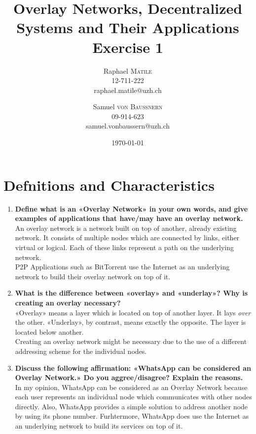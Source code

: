 \documentclass{article}
\title{Overlay Networks, Decentralized Systems and Their Applications\\Exercise 1} %
\author{Raphael \textsc{Matile}\\12-711-222\\raphael.matile@uzh.ch \and Samuel \textsc{von Baussnern}\\09-914-623\\samuel.vonbaussern@uzh.ch}
\date{\today} %
\begin{document}
\maketitle %

\section{Defnitions and Characteristics}
  \begin{enumerate}[1]
    \item \textbf{Define what is an «Overlay Network» in your own words, and give examples of applications that have/may have an overlay network.} \\
            An overlay network is a network built on top of another, 
            already existing network. It consists of multiple nodes which 
            are connected by links, either virtual or logical. 
            Each of these links represent a path on the underlying network. \\
            P2P Applications such as BitTorrent use the Internet as an underlying network to build their overlay network on top of it.
    \item \textbf{What is the difference between «overlay» and «underlay»? Why is creating an overlay necessary?} \\
            «Overlay» means a layer which is located on top of another layer. 
            It lays \textit{over} the other. «Underlay», by contrast, means exactly the opposite. 
            The layer is located below another. \\
            Creating an overlay network might be necessary due to the use of a different addressing scheme for the individual nodes.
    \item \textbf{Discuss the following affirmation: «WhatsApp can be considered an Overlay Network.» Do you aggree/disagree? Explain the reasons.} \\
            In my opinion, WhatsApp can be considered as an Overlay Network because each user represents an individual node which 
            communicates with other nodes directly. Also, WhatsApp provides a simple solution to address another node by using its phone number.
            Furhtermore, WhatsApp does use the Internet as an underlying network to build its services on top of it.
  \end{enumerate}
\end{document}
